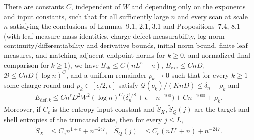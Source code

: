 \begin{lemma}
    \label{thm:al_scanner_from_inputs}
    \leanok
    There are constants $C$, independent of $W$ and depending only on the
    exponents and input constants, such that for all sufficiently large $n$ and
    every scan at scale $n$ satisfying the conclusions of Lemmas~9.1, 2.1, 3.1
    and Propositions~7.4, 8.1 (with leaf-measure mass identities, charge-defect
    measurability, log-norm continuity/differentiability and derivative bounds,
    initial norm bound, finite leaf measures, and matching adjacent endpoint
    norms for $k\ge0$, and normalized final comparison for $k\ge1$), we have
    $B_{\mathrm{sh}}\le C(nL^e+n)$, $B_{\mathrm{exc}}\le CnD$,
    $\mathcal B\le CnD(\log n)^{C}$, and a uniform remainder $\rho_k\to0$ such
    that for every $k\ge1$ some charge round and $p_k\in[\epsilon/2,\epsilon]$
    satisfy $\mathcal Q(p_k)/(KnD)\le\delta_n+\rho_k$ and
    \begin{align}
        E_{\mathrm{def},k}\le Cn^\ell D^2W^2(\log n)^{C}
        \bigl(\delta_n^{1/8}+\epsilon+n^{-100}\bigr)+Cn^{-1000}+\rho_k.
        \label{eq:al_scanner_energy}
    \end{align}
    Moreover, if $C_e$ is the entropy-input constant and
    $\widetilde S_X,\widetilde S_Q(j)$ are the target and shell entropies of the
    truncated state, then for every $j\le L$,
    \begin{align}
        \widetilde S_X    & \le C_e n^{1+e}+n^{-247}, &
        \widetilde S_Q(j) & \le C_e(nL^e+n)+n^{-247}.
        \label{eq:al_scanner_truncated_entropies}
    \end{align}
\end{lemma}
